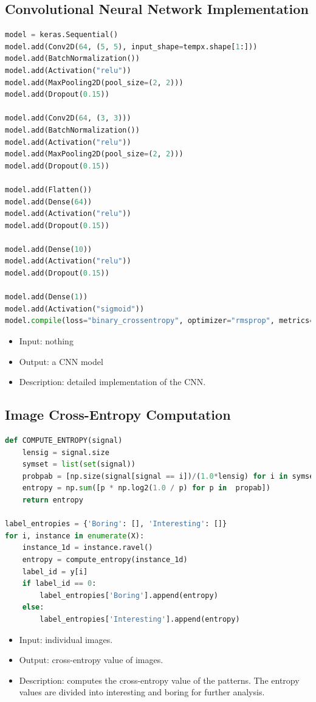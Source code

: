 \documentclass[12pt]{article}
\numberwithin{figure}{section} %
\begin{document}
\subsection{Convolutional Neural Network Implementation}
\label{subsection:Convolutional Neural Network Implementation}
\begin{lstlisting}[language = Python]
model = keras.Sequential()
model.add(Conv2D(64, (5, 5), input_shape=tempx.shape[1:]))
model.add(BatchNormalization())
model.add(Activation("relu"))
model.add(MaxPooling2D(pool_size=(2, 2)))
model.add(Dropout(0.15))

model.add(Conv2D(64, (3, 3)))
model.add(BatchNormalization())
model.add(Activation("relu"))
model.add(MaxPooling2D(pool_size=(2, 2)))
model.add(Dropout(0.15))

model.add(Flatten())
model.add(Dense(64))
model.add(Activation("relu"))
model.add(Dropout(0.15))

model.add(Dense(10))
model.add(Activation("relu"))
model.add(Dropout(0.15))

model.add(Dense(1))
model.add(Activation("sigmoid"))
model.compile(loss="binary_crossentropy", optimizer="rmsprop", metrics=["accuracy"])
\end{lstlisting}
\vspace{-1.5em}
\begin{itemize}[leftmargin = 0.5cm, topsep=0pt,itemsep=-1ex,partopsep=1ex,parsep=1ex]
\item Input: nothing 
\item Output: a CNN model 
\item Description: detailed implementation of the CNN. 
\end{itemize}

\subsection{Image Cross-Entropy Computation}
\label{subsection:Image Cross-Entropy Computation}
\begin{lstlisting}[language = Python]
def COMPUTE_ENTROPY(signal)
    lensig = signal.size
    symset = list(set(signal))
    probpab = [np.size(signal[signal == i])/(1.0*lensig) for i in symset]
    entropy = np.sum([p * np.log2(1.0 / p) for p in  propab])
    return entropy

label_entropies = {'Boring': [], 'Interesting': []}
for i, instance in enumerate(X):
    instance_1d = instance.ravel()
    entropy = compute_entropy(instance_1d)
    label_id = y[i]
    if label_id == 0:
        label_entropies['Boring'].append(entropy)
    else:
        label_entropies['Interesting'].append(entropy)
\end{lstlisting}
\vspace{-1.5em}
\begin{itemize}[leftmargin = 0.5cm, topsep=0pt,itemsep=-1ex,partopsep=1ex,parsep=1ex]
\item Input: individual images. 
\item Output: cross-entropy value of images. 
\item Description: computes the cross-entropy value of the patterns. The entropy values are divided into interesting and boring for further analysis. 
\end{itemize}
\end{document}
